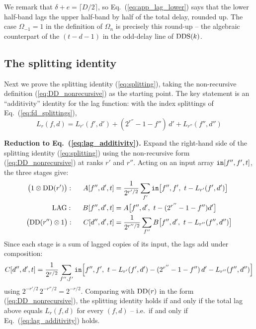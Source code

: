 \documentclass{article}
\numberwithin{equation}{section}   %
\def\DDS{{\rm DDS}}
\def\DD{{\rm DD}}
\def\LAG{{\rm LAG}}
\def\nn{\nonumber}
\begin{document}
We remark that $\delta + e = \lceil D/2 \rceil$, so Eq.\ (\ref{eq:app_lag_lower}) says that the
lower half-band lags the upper half-band by half of the total delay, rounded up. The case
$\Omega_{-1} = 1$ in the definition of $\Omega_n$ is precisely this round-up -- the algebraic
counterpart of the $(t-d-1)$ in the odd-delay line of $\DDS(k)$.

\subsection{The splitting identity}
\label{app:splitting_proof}

Next we prove the splitting identity (\ref{eq:splitting}), taking the non-recursive definition
(\ref{eq:DD_nonrecursive}) as the starting point. The key statement is an ``additivity''
identity for the lag function: with the index splittings of Eq.\ (\ref{eq:fd_splittings}),
\begin{equation}
L_r(f, d) = L_{r'}(f', d') + (2^{r''} - 1 - f'') \, d' + L_{r''}(f'', d'')
\label{eq:lag_additivity}
\end{equation}

\par\noindent
{\bf Reduction to Eq.\ (\ref{eq:lag_additivity}).}
Expand the right-hand side of the splitting identity (\ref{eq:splitting}) using the
non-recursive form (\ref{eq:DD_nonrecursive}) at ranks $r'$ and $r''$. Acting on an input array
${\tt in}[f'', f', t]$, the three stages give:
\begin{align}
\big( 1 \otimes \DD(r') \big): \hspace{0.5cm}
  A[f'', d', t] &= \frac{1}{2^{r'/2}} \sum_{f'} {\tt in}\big[ f'', f',\ t - L_{r'}(f', d') \big] \nn \\
\LAG: \hspace{0.5cm}
  B[f'', d', t] &= A\big[ f'', d',\ t - (2^{r''}-1-f'') d' \big] \nn \\
\big( \DD(r'') \otimes 1 \big): \hspace{0.5cm}
  C[d'', d', t] &= \frac{1}{2^{r''/2}} \sum_{f''} B\big[ f'', d',\ t - L_{r''}(f'', d'') \big]
\end{align}
Since each stage is a sum of lagged copies of its input, the lags add under composition:
\begin{equation}
C[d'', d', t] = \frac{1}{2^{r/2}} \sum_{f'', f'}
  {\tt in}\Big[ f'', f',\ t - L_{r'}(f',d') - (2^{r''}-1-f'')\,d' - L_{r''}(f'',d'') \Big]
\end{equation}
using $2^{-r'/2}\, 2^{-r''/2} = 2^{-r/2}$. Comparing with $\DD(r)$ in the form
(\ref{eq:DD_nonrecursive}), the splitting identity holds if and only if the total lag above
equals $L_r(f,d)$ for every $(f,d)$ -- i.e.\ if and only if Eq.\ (\ref{eq:lag_additivity})
holds.
\end{document}
